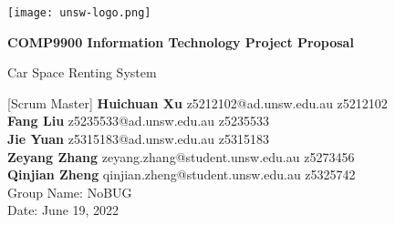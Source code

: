 \begin{titlepage}
  \begin{center}
      \vspace*{1cm}

      \texttt{[image: unsw-logo.png]}

      \Huge
      \textbf{COMP9900 Information Technology Project Proposal}

      \vspace{0.5cm}
      \LARGE
      Car Space Renting System
           
      \vspace{1.5cm}
      \large
      [Scrum Master]
      \textbf{Huichuan Xu} z5212102@ad.unsw.edu.au z5212102\\
      \textbf{Fang Liu} z5235533@ad.unsw.edu.au z5235533\\
      \textbf{Jie Yuan} z5315183@ad.unsw.edu.au z5315183\\
      \textbf{Zeyang Zhang} zeyang.zhang@student.unsw.edu.au z5273456\\
      \textbf{Qinjian Zheng} qinjian.zheng@student.unsw.edu.au z5325742\\

      \vfill
      \Large
      Group Name: NoBUG\\
      Date: June 19, 2022
           
  \end{center}
\end{titlepage}